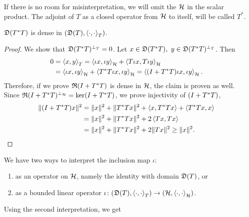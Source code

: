 If there is no room for misinterpretation,
we will omit the $\mathcal{H}$ in the scalar product. The adjoint of $T$ as a closed 
operator from $\mathcal{H}$ to itself, will be called $T^*$. 
\begin{lem}\label{TTstrDense}
 $\mathfrak{D}(T^{*} T)$ is dense in $( \mathfrak{D}(T) , \left\langle \cdot, \cdot \right\rangle_T)$.
\end{lem}
\begin{proof}
 We show that $\mathfrak{D}(T ^{*} T)^{\perp_T} = 0$. Let $x \in \mathfrak{D}(T ^{*} T), 
 ~y \in \mathfrak{D}(T ^{*} T)^{\perp_T}$. Then
 \begin{align*}
  0 &=\left\langle x, y \right\rangle_T = \left\langle \iota x, \iota y \right\rangle_{\mathcal{H}} + \left\langle T\iota x, T\iota y \right\rangle
  _{\mathcal{H}} \\
  &=\left\langle \iota x, \iota y \right\rangle_{\mathcal{H}} + \left\langle T^{*} T\iota x, \iota y \right\rangle_{\mathcal{H}}
= \left\langle (I + T ^{*} T) \iota x, \iota y \right\rangle_{\mathcal{H}}.
 \end{align*}
Therefore, if we prove $\mathfrak{R}(I + T^{*} T)$ is dense in $\mathcal{H}$, the claim is
proven as well. Since $\mathfrak{R}(I + T^{*} T)^{\perp_{\mathcal{H}}} = \ker(I + T^{*} T)$, we prove
injectivity of $(I + T^{*} T)$,
\begin{align*}
 \| (I + T^{*} T)x \| ^2  
 &= \|x \| ^2 + \| T ^{*} T x\| ^2 + \left\langle x, T^{*} T x \right\rangle
 + \left\langle T ^{*} T x, x \right\rangle\\
 &=\|x \| ^2 + \| T ^{*} T x\| ^2 + 2\left\langle Tx,  T x \right\rangle \\
 &= \|x \| ^2 + \| T ^{*} T x\| ^2 + 2\|T x\|^2 \geq \|x\|^2.
\end{align*}

\end{proof}
We have two ways to interpret the inclusion map $\iota$:
\begin{enumerate}
 \item as an operator on $\mathcal{H}$, namely the identity with domain $\mathfrak{D}(T)$, or
 \item as a bounded linear operator $\iota \colon ( \mathfrak{D}(T) , \left\langle \cdot, \cdot \right\rangle_T)
 \to ( \mathcal{H} , \left\langle \cdot, \cdot \right\rangle_{\mathcal{H}})$.
\end{enumerate}
Using the second interpretation, we get

